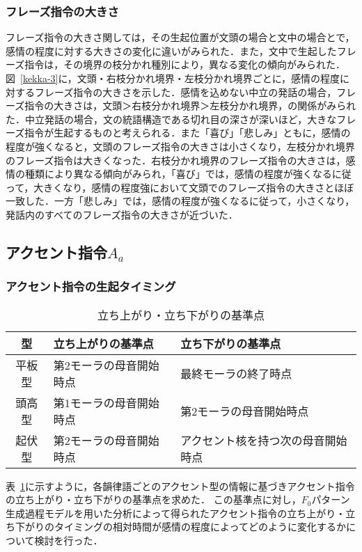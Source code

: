 \documentclass[japanese]{jnlp_1.3b}
\begin{document}
\subsubsection{フレーズ指令の大きさ}
フレーズ指令の大きさ関しては，その生起位置が文頭の場合と文中の場合とで，感情の程度に対する大きさの変化に違いがみられた．また，文中で生起したフレーズ指令は，その境界の枝分かれ種別により，異なる変化の傾向がみられた．図~\ref{kekka-3}に，文頭・右枝分かれ境界・左枝分かれ境界ごとに，感情の程度に対するフレーズ指令の大きさを示した．感情を込めない中立の発話の場合，フレーズ指令の大きさは，文頭＞右枝分かれ境界＞左枝分かれ境界，の関係がみられた．中立発話の場合，文の統語構造である切れ目の深さが深いほど，大きなフレーズ指令が生起するものと考えられる．また「喜び」「悲しみ」ともに，感情の程度が強くなると，文頭のフレーズ指令の大きさは小さくなり，左枝分かれ境界のフレーズ指令は大きくなった．右枝分かれ境界のフレーズ指令の大きさは，感情の種類により異なる傾向がみられ，「喜び」では，感情の程度が強くなるに従って，大きくなり，感情の程度強において文頭でのフレーズ指令の大きさとほぼ一致した．一方「悲しみ」では，感情の程度が強くなるに従って，小さくなり，発話内のすべてのフレーズ指令の大きさが近づいた．

\subsection{アクセント指令$A_a$}\label{Aa}
\subsubsection{アクセント指令の生起タイミング}


\begin{table}[b]
\begin{center}
\caption{立ち上がり・立ち下がりの基準点}
\label{basetime}
\begin{tabular}{cll}
\hline
型&立ち上がりの基準点&立ち下がりの基準点\\
\hline
平板型&第2モーラの母音開始時点&最終モーラの終了時点\\
頭高型&第1モーラの母音開始時点&第2モーラの母音開始時点\\
起伏型&第2モーラの母音開始時点&アクセント核を持つ次の母音開始時点\\
\hline
\end{tabular}
\end{center}
\end{table}


表~\ref{basetime}に示すように，各韻律語ごとのアクセント型の情報に基づきアクセント指令の立ち上がり・立ち下がりの基準点を求めた\cite{kawa}．
この基準点に対し，$F_0$パターン生成過程モデルを用いた分析によって得られたアクセント指令の立ち上がり・立ち下がりのタイミングの相対時間が感情の程度によってどのように変化するかについて検討を行った．
\end{document}
